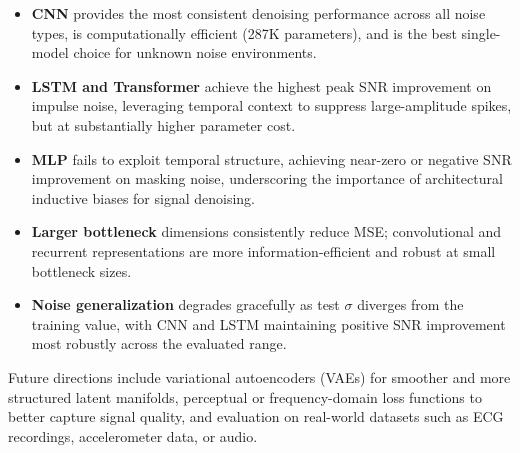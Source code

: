 \documentclass{article}
\begin{document}
\begin{itemize}
    \item \textbf{CNN} provides the most consistent denoising performance across all noise
          types, is computationally efficient (287K parameters), and is the best
          single-model choice for unknown noise environments.
    \item \textbf{LSTM and Transformer} achieve the highest peak SNR improvement on
          impulse noise, leveraging temporal context to suppress large-amplitude spikes,
          but at substantially higher parameter cost.
    \item \textbf{MLP} fails to exploit temporal structure, achieving near-zero or
          negative SNR improvement on masking noise, underscoring the importance of
          architectural inductive biases for signal denoising.
    \item \textbf{Larger bottleneck} dimensions consistently reduce MSE; convolutional
          and recurrent representations are more information-efficient and robust at small
          bottleneck sizes.
    \item \textbf{Noise generalization} degrades gracefully as test $\sigma$ diverges
          from the training value, with CNN and LSTM maintaining positive SNR improvement
          most robustly across the evaluated range.
\end{itemize}

Future directions include variational autoencoders (VAEs) for smoother and more
structured latent manifolds, perceptual or frequency-domain loss functions to better
capture signal quality, and evaluation on real-world datasets such as ECG recordings,
accelerometer data, or audio.



\end{document}
